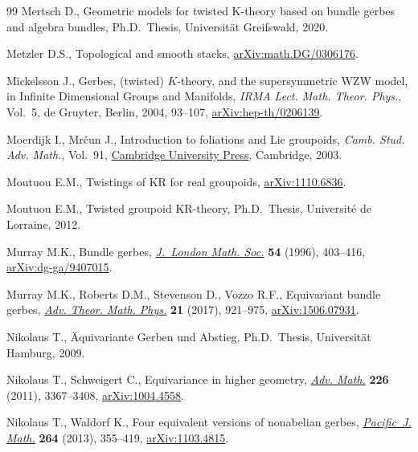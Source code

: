 \documentclass[pdftex]{sigma}
\numberwithin{equation}{section}
\begin{document}
\begin{thebibliography}{99}
Mertsch D., Geometric models for twisted {K}-theory based on bundle gerbes and
 algebra bundles, Ph.D.~Thesis, {U}niversit\"at Greifswald, 2020.

Metzler D.S., Topological and smooth stacks,
 \href{http://arxiv.org/abs/math.DG/0306176}{arXiv:math.DG/0306176}.

Mickelsson J., Gerbes, (twisted) {$K$}-theory, and the supersymmetric {WZW}
 model, in Infinite {D}imensional {G}roups and {M}anifolds, \textit{IRMA Lect.
 Math. Theor. Phys.}, Vol.~5, de Gruyter, Berlin, 2004, 93--107,
 \href{http://arxiv.org/abs/hep-th/0206139}{arXiv:hep-th/0206139}.

Moerdijk I., Mr\v{c}un J., Introduction to foliations and {L}ie groupoids,
 \textit{Camb. Stud. Adv. Math.}, Vol.~91,
 \href{https://doi.org/10.1017/CBO9780511615450}{Cambridge University Press},
 Cambridge, 2003.

Moutuou E.M., Twistings of {KR} for real groupoids,
 \href{http://arxiv.org/abs/1110.6836}{arXiv:1110.6836}.

Moutuou E.M., Twisted groupoid {KR}-theory, Ph.D.~Thesis, {U}niversit\'e de
 Lorraine, 2012.

Murray M.K., Bundle gerbes,
 \href{https://doi.org/10.1093/acprof:oso/9780199534920.003.0012}{\textit{J.~London
 Math. Soc.}} \textbf{54} (1996), 403--416,
 \href{http://arxiv.org/abs/dg-ga/9407015}{arXiv:dg-ga/9407015}.

Murray M.K., Roberts D.M., Stevenson D., Vozzo R.F., Equivariant bundle gerbes,
 \href{https://doi.org/10.4310/ATMP.2017.v21.n4.a3}{\textit{Adv. Theor. Math.
 Phys.}} \textbf{21} (2017), 921--975,
 \href{http://arxiv.org/abs/1506.07931}{arXiv:1506.07931}.

Nikolaus T., \"Aquivariante {G}erben und {A}bstieg, Ph.D.~Thesis,
 {U}niversit\"at Hamburg, 2009.

Nikolaus T., Schweigert C., Equivariance in higher geometry,
 \href{https://doi.org/10.1016/j.aim.2010.10.016}{\textit{Adv. Math.}}
 \textbf{226} (2011), 3367--3408,
 \href{http://arxiv.org/abs/1004.4558}{arXiv:1004.4558}.

Nikolaus T., Waldorf K., Four equivalent versions of nonabelian gerbes,
 \href{https://doi.org/10.2140/pjm.2013.264.355}{\textit{Pacific~J. Math.}}
 \textbf{264} (2013), 355--419,
 \href{http://arxiv.org/abs/1103.4815}{arXiv:1103.4815}.


\end{thebibliography}
\end{document}
